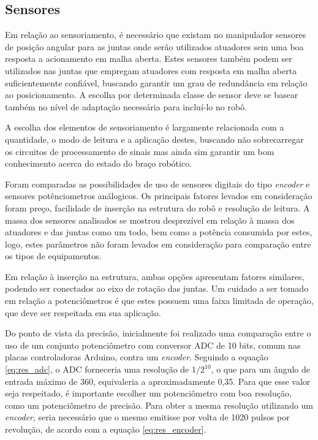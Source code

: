 \subsection{Sensores}
Em relação ao sensoriamento, é necessário que existam no manipulador 
sensores de posição angular para as juntas onde serão utilizados 
atuadores sem uma boa resposta a acionamento em malha aberta. Estes sensores
também podem ser utilizados nas juntas que empregam atuadores com 
resposta em malha aberta suficientemente confiável, buscando garantir 
um grau de redundância em relação ao posicionamento. A escolha por determinada 
classe de sensor deve se basear também no nível de adaptação necessária para 
incluí-lo no robô. 

A escolha dos elementos de sensoriamento é largamente relacionada com a 
quantidade, o modo de leitura e a aplicação destes, buscando não sobrecarregar os circuitos 
de processamento de sinais mas ainda sim garantir um bom conhecimento 
acerca do estado do braço robótico. 

Foram comparadas as possibilidades de uso de sensores digitais do tipo \textit{encoder}
e sensores potênciometros análogicos.
Os principais fatores levados em consideração foram preço, facilidade de 
inserção na estrutura do robô e resolução de leitura. 
A massa dos sensores analisados se mostrou desprezível em relação à massa dos 
atuadores e das juntas como um todo, bem como a potência consumida por 
estes, logo, estes parâmetros não foram levados em consideração para 
comparação entre os tipos de equipamentos.

Em relação à inserção na estrutura, ambas opções apresentam fatores similares, 
podendo ser conectados ao eixo de rotação das juntas. 
Um cuidado a ser tomado em relação a potenciômetros é que estes possuem uma 
faixa limitada de operação, que deve ser respeitada em sua aplicação.

Do ponto de vista da precisão, inicialmente foi realizado uma comparação entre o uso de 
um conjunto potenciômetro com conversor ADC de 10 bits, comum nas placas controladoras
Arduino, contra um \textit{encoder}.  
Seguindo a equação \ref{eq:res_adc}, o ADC forneceria uma resolução de $1/2^{10}$, o que para 
um ângulo de entrada máximo de 360\textdegree, equivaleria a aproximadamente 0,35\textdegree.
Para que esse valor seja respeitado, é importante escolher um potenciômetro com boa resolução, 
como um potenciômetro de precisão.
Para obter a mesma resolução utilizando um \textit{encoder}, seria necessário que o mesmo emitisse
por volta de 1020 pulsos por revolução, de acordo com a equação \ref{eq:res_encoder}.

